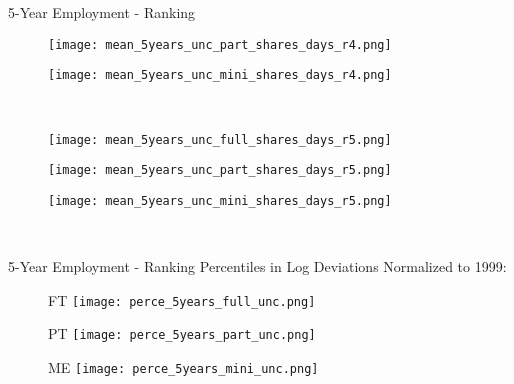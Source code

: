 \documentclass[hyperref={bookmarks=false}]{beamer}
\begin{document}
\begin{appendix}
\begin{frame}{5-Year Employment - Ranking}
\begin{figure}[!t]
\begin{minipage}[b]{0.15\textwidth}{}
\texttt{[image: mean\_5years\_unc\_part\_shares\_days\_r4.png]}
\end{minipage}
\begin{minipage}[b]{0.15\textwidth}{}
\centering
\texttt{[image: mean\_5years\_unc\_mini\_shares\_days\_r4.png]}
\end{minipage}\\
\begin{minipage}[b]{0.15\textwidth}{}
\centering
\texttt{[image: mean\_5years\_unc\_full\_shares\_days\_r5.png]}
\end{minipage}
\begin{minipage}[b]{0.15\textwidth}{}
\centering
\texttt{[image: mean\_5years\_unc\_part\_shares\_days\_r5.png]}
\end{minipage}
\begin{minipage}[b]{0.15\textwidth}{}
\centering
\texttt{[image: mean\_5years\_unc\_mini\_shares\_days\_r5.png]}
\end{minipage}\\
\end{figure}
\end{frame}

\begin{frame}{5-Year Employment - Ranking}
Percentiles in Log Deviations Normalized to 1999:
\begin{figure}[!t]
\begin{minipage}[b]{0.3\textwidth}{FT}
\centering
\texttt{[image: perce\_5years\_full\_unc.png]}
\end{minipage}
\begin{minipage}[b]{0.3\textwidth}{PT}
\centering
\texttt{[image: perce\_5years\_part\_unc.png]}
\end{minipage}
\begin{minipage}[b]{0.3\textwidth}{ME}
\centering
\texttt{[image: perce\_5years\_mini\_unc.png]}
\end{minipage}\\
\end{figure}
\end{frame}


\end{appendix}
\end{document}
